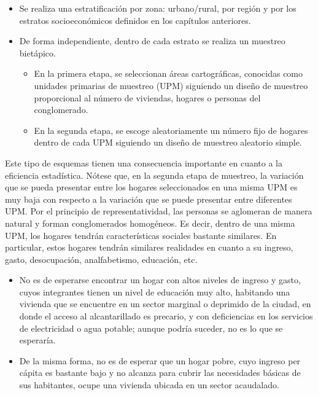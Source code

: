 \documentclass[
  10pt,
  spanish,
]{book}
\providecommand{\tightlist}{%
  \setlength{\itemsep}{0pt}\setlength{\parskip}{0pt}}
\begin{document}
\begin{itemize}
\tightlist
\item
  Se realiza una estratificación por zona: urbano/rural, por región y por los estratos socioeconómicos definidos en los capítulos anteriores.
\item
  De forma independiente, dentro de cada estrato se realiza un muestreo bietápico.

  \begin{itemize}
  \tightlist
  \item
    En la primera etapa, se seleccionan áreas cartográficas, conocidas como unidades primarias de muestreo (UPM) siguiendo un diseño de muestreo proporcional al número de viviendas, hogares o personas del conglomerado.
  \item
    En la segunda etapa, se escoge aleatoriamente un número fijo de hogares dentro de cada UPM siguiendo un diseño de muestreo aleatorio simple.
  \end{itemize}
\end{itemize}

Este tipo de esquemas tienen una consecuencia importante en cuanto a la eficiencia estadística. Nótese que, en la segunda etapa de muestreo, la variación que se pueda presentar entre los hogares seleccionados en una misma UPM es muy baja con respecto a la variación que se puede presentar entre diferentes UPM. Por el principio de representatividad, las personas se aglomeran de manera natural y forman conglomerados homogéneos. Es decir, dentro de una misma UPM, los hogares tendrán características sociales bastante similares. En particular, estos hogares tendrán similares realidades en cuanto a su ingreso, gasto, desocupación, analfabetismo, educación, etc.

\begin{itemize}
\tightlist
\item
  No es de esperarse encontrar un hogar con altos niveles de ingreso y gasto, cuyos integrantes tienen un nivel de educación muy alto, habitando una vivienda que se encuentre en un sector marginal o deprimido de la ciudad, en donde el acceso al alcantarillado es precario, y con deficiencias en los servicios de electricidad o agua potable; aunque podría suceder, no es lo que se esperaría.
\item
  De la misma forma, no es de esperar que un hogar pobre, cuyo ingreso per cápita es bastante bajo y no alcanza para cubrir las necesidades básicas de sus habitantes, ocupe una vivienda ubicada en un sector acaudalado.
\end{itemize}
\end{document}
